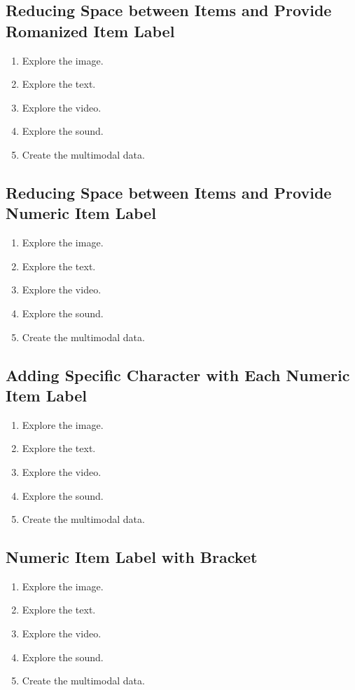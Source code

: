\documentclass[11pt]{article}
\begin{document}
\subsection{Reducing Space between Items and Provide Romanized Item Label}
\begin{enumerate}[nosep, label=\roman*]
\item Explore the image.
\item Explore the text.
\item Explore the video.
\item Explore the sound.
\item Create the multimodal data.
\end{enumerate}

\subsection{Reducing Space between Items and Provide Numeric Item Label}
\begin{enumerate}[nosep, label=\arabic*]
\item Explore the image.
\item Explore the text.
\item Explore the video.
\item Explore the sound.
\item Create the multimodal data.
\end{enumerate}

\subsection{Adding Specific Character with Each Numeric Item Label}
\begin{enumerate}[nosep, label=B\arabic*]
\item Explore the image.
\item Explore the text.
\item Explore the video.
\item Explore the sound.
\item Create the multimodal data.
\end{enumerate}


\subsection{Numeric Item Label with Bracket}
\begin{enumerate}[nosep, label=(\arabic*)]
\item Explore the image.
\item Explore the text.
\item Explore the video.
\item Explore the sound.
\item Create the multimodal data.
\end{enumerate}
\end{document}
